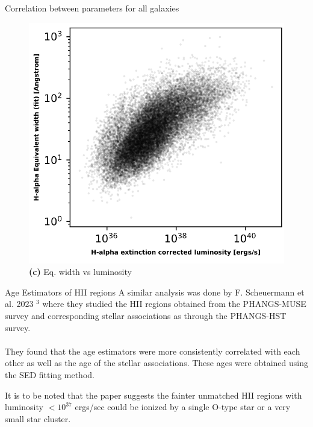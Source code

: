 \documentclass{beamer}
\begin{document}
\begin{frame}{Correlation between parameters for all galaxies}
    \begin{figure}[H]
        \centering
        \includegraphics[scale = 0.15]{image39.png}
        \caption*{\textbf{(c)} Eq. width vs luminosity}
        \label{fig:image7}
    \end{figure}
    
\end{frame}



\begin{frame}{Age Estimators of HII regions}
    A similar analysis was done by F. Scheuermann et al. 2023 $^3$ where they studied the HII regions obtained from the PHANGS-MUSE survey and corresponding stellar associations as through the PHANGS-HST survey. 
    \\~\\
    They found that the age estimators were more consistently correlated with each other as well as the age of the stellar associations. These ages were obtained using the SED fitting method. 

    It is to be noted that the paper suggests the fainter unmatched HII regions with luminosity $ < 10^{37}$ ergs/sec could be ionized by a single O-type star or a very small star cluster. 
\end{frame}
\end{document}
